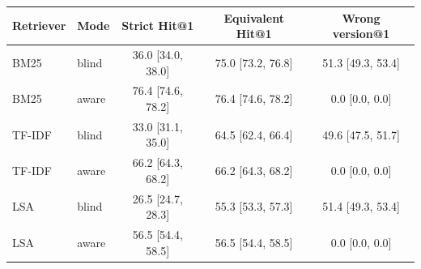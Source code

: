 \begin{tabular}{llccc}
\toprule
Retriever & Mode & Strict Hit@1 & Equivalent Hit@1 & Wrong version@1 \\
\midrule
BM25 & blind & 36.0 [34.0, 38.0] & 75.0 [73.2, 76.8] & 51.3 [49.3, 53.4] \\
BM25 & aware & 76.4 [74.6, 78.2] & 76.4 [74.6, 78.2] & 0.0 [0.0, 0.0] \\
TF-IDF & blind & 33.0 [31.1, 35.0] & 64.5 [62.4, 66.4] & 49.6 [47.5, 51.7] \\
TF-IDF & aware & 66.2 [64.3, 68.2] & 66.2 [64.3, 68.2] & 0.0 [0.0, 0.0] \\
LSA & blind & 26.5 [24.7, 28.3] & 55.3 [53.3, 57.3] & 51.4 [49.3, 53.4] \\
LSA & aware & 56.5 [54.4, 58.5] & 56.5 [54.4, 58.5] & 0.0 [0.0, 0.0] \\
\bottomrule
\end{tabular}
